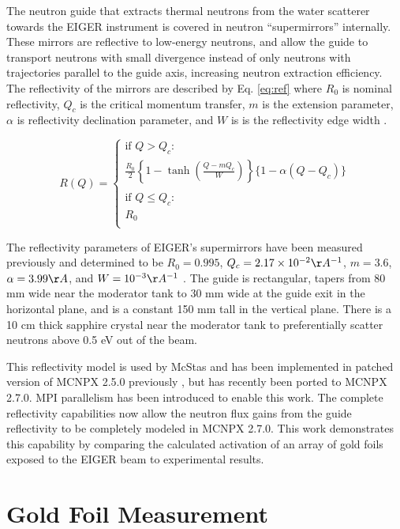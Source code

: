 \documentclass[a4paper,
              ]{jacow}
\begin{document}
The neutron guide that extracts thermal neutrons from the water scatterer towards the EIGER instrument is covered in neutron ``supermirrors'' internally.  These mirrors are reflective to low-energy neutrons, and allow the guide to transport neutrons with small divergence instead of only neutrons with trajectories parallel to the guide axis, increasing neutron extraction efficiency.  The reflectivity of the mirrors are described by Eq. \ref{eq:ref} where $R_0$ is nominal reflectivity, $Q_c$ is the critical momentum transfer, $m$ is the extension parameter, $\alpha$ is reflectivity declination parameter, and $W$ is is the reflectivity edge width \cite{mcnpx-ref}.

\begin{equation}\label{eq:ref}
R(Q) = 
\begin{cases}
    \mbox{if } Q > Q_c : \\
    \frac{R_0}{2}\left\{  1 - \tanh\left(  \frac{Q - m Q_c}{W}\right) \right\}\{1-\alpha(Q-Q_c)\} \\
    \\
    \mbox{if } Q \leq Q_c :\\
    R_0 \\
\end{cases}
\end{equation}

The reflectivity parameters of EIGER's supermirrors have been measured previously and determined to be $R_0=0.995$, $Q_c=2.17\times10^{-2}\AA^{-1}$, $m=3.6$, $\alpha=3.99 \AA$, and $W=10^{-3} \AA^{-1}$ \cite{eiger-uwe}.  The guide is rectangular, tapers from 80 mm wide near the moderator tank to 30 mm wide at the guide exit in the horizontal plane, and is a constant 150 mm tall in the vertical plane.  There is a 10 cm thick sapphire crystal near the moderator tank to preferentially scatter neutrons above 0.5 eV out of the beam.

This reflectivity model is used by McStas and has been implemented in patched version of MCNPX 2.5.0 previously \cite{mcnpx-ref}, but has recently been ported to MCNPX 2.7.0.  MPI parallelism has been introduced to enable this work.  The complete reflectivity capabilities now allow the neutron flux gains from the guide reflectivity to be completely modeled in MCNPX 2.7.0.  This work demonstrates this capability by comparing the calculated activation of an array of gold foils exposed to the EIGER beam to experimental results.


\section{Gold Foil Measurement}
\end{document}
